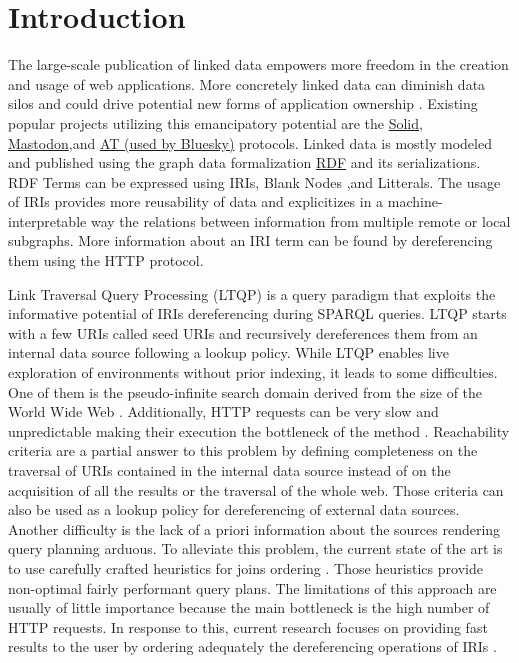 
\section{Introduction}
 
The large-scale publication of linked data empowers more freedom in the creation and usage of web applications.
More concretely linked data can diminish data silos \cite{Verstraete2022}
and could drive potential new forms of application ownership \cite{Mechant2021}.
Existing popular projects utilizing this emancipatory potential are the \href{https://solidproject.org/TR/protocol}{Solid},
\href{https://docs.joinmastodon.org/}{Mastodon},and \href{https://atproto.com/}{AT (used by Bluesky)} protocols.
Linked data is mostly modeled and published using the graph data formalization \href{https://www.w3.org/TR/rdf12-concepts/}{RDF} and its serializations.
RDF Terms can be expressed using IRIs, Blank Nodes ,and Litterals.
The usage of IRIs provides more reusability of data and explicitizes in a machine-interpretable way the relations between
information from multiple remote or local subgraphs.
More information about an IRI term can be found by dereferencing them using the HTTP protocol.

Link Traversal Query Processing (LTQP) \cite{Hartig2012} is a query paradigm that exploits
the informative potential of IRIs dereferencing during SPARQL queries.
LTQP starts with a few URIs called seed URIs and recursively dereferences them from an internal data source following a lookup policy.
While LTQP enables live exploration of environments without prior indexing, it leads to some difficulties.
One of them is the pseudo-infinite search domain derived from the size of the World Wide Web \cite{Hartig2014}.
Additionally, HTTP requests can be very slow and unpredictable making their execution the bottleneck of the method \cite{hartig2016walking}.
Reachability criteria \cite{Hartig2012} are a partial answer to this problem by defining completeness on the traversal of URIs
contained in the internal data source instead of on the acquisition of all the results or the traversal of the whole web.
Those criteria can also be used as a lookup policy for dereferencing of external data sources.
Another difficulty is the lack of a priori information about the sources rendering query planning arduous.
To alleviate this problem, the current state of the art is to use carefully crafted heuristics for joins ordering \cite{Hartig2011}.
Those heuristics provide non-optimal fairly performant query plans.
The limitations of this approach are usually of little importance because the main bottleneck is the high number of HTTP requests.
In response to this, current research focuses on providing fast results to the user by ordering adequately the dereferencing operations of IRIs \cite{hartig2016walking}.

